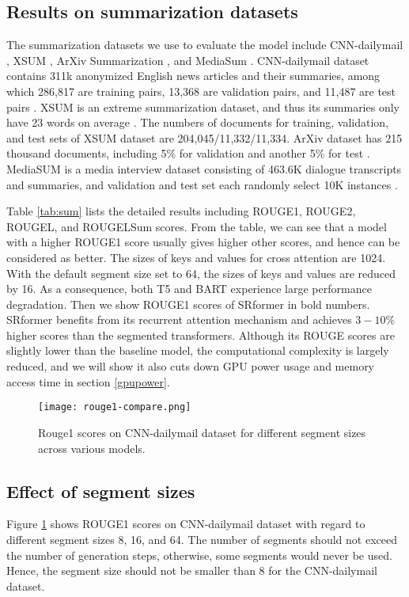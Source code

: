 \documentclass[11pt]{article}
\begin{document}
\subsection{Results on summarization datasets}
The summarization datasets we use to evaluate the model include CNN-dailymail \citep{nallapati-etal-2016-abstractive}, XSUM \citep{xsum-emnlp}, ArXiv Summarization \citep{arxiv-sum}, and MediaSum \citep{zhu-etal-2021-mediasum}. CNN-dailymail dataset contains 311k anonymized English news articles and their summaries, among which 286,817 are training pairs, 13,368 are validation pairs, and 11,487 are test pairs \citep{CNN-qa, see-etal-2017-get}. XSUM is an extreme summarization dataset, and thus its summaries only have 23 words on average \cite{xsum-emnlp}. The numbers of documents for training, validation, and test sets of XSUM dataset are 204,045/11,332/11,334. ArXiv dataset has 215 thousand documents, including 5\% for validation and another 5\% for test \cite{arxiv-sum}. MediaSUM is a media interview dataset consisting of 463.6K dialogue transcripts and summaries, and  validation and test set each randomly select 10K instances \cite{zhu-etal-2021-mediasum}.

 Table \ref{tab:sum} lists the detailed results including ROUGE1, ROUGE2, ROUGEL, and ROUGELSum scores. From the table, we can see that a model with a higher ROUGE1 score usually gives higher other scores, and hence can be considered as better. The sizes of keys and values for cross attention are 1024. With the default segment size set to 64, the sizes of keys and values are reduced by 16.  As a consequence, both T5 and BART experience large performance degradation. Then we show ROUGE1 scores of SRformer in bold numbers. SRformer benefits from its recurrent attention mechanism and achieves  $3-10\%$ higher scores than the segmented transformers. Although its ROUGE scores are slightly lower than the baseline model, the computational complexity is largely reduced, and we will show it also cuts down GPU power usage and memory access time in section \ref{gpupower}.

 \begin{figure}[htbp]
    \centering
    \texttt{[image: rouge1-compare.png]}
\caption{Rouge1 scores on CNN-dailymail dataset for different segment sizes across various models.}
    \label{fig:rouge1}
\end{figure}
\subsection{Effect of segment sizes}
Figure \ref{fig:rouge1} shows ROUGE1 scores on CNN-dailymail dataset with regard to different segment sizes 8, 16, and 64. The number of segments should not exceed the number of generation steps, otherwise, some segments would never be used. Hence, the segment size should not be smaller than 8 for the CNN-dailymail dataset.
\end{document}
